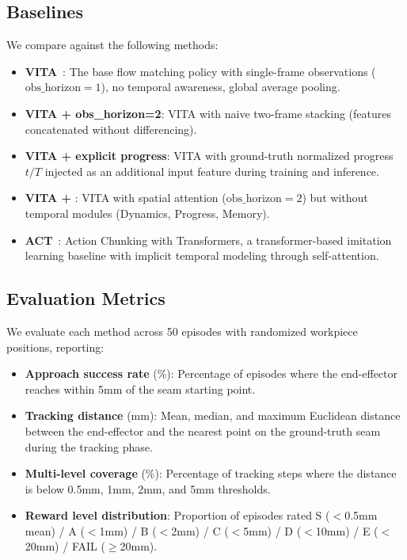 \subsection{Baselines}
\label{sec:baselines}

We compare \method{} against the following methods:

\begin{itemize}[leftmargin=*,itemsep=2pt]
    \item \textbf{VITA}~\cite{gao2026vita}: The base flow matching policy with single-frame observations ($\text{obs\_horizon}=1$), no temporal awareness, global average pooling.
    \item \textbf{VITA + obs\_horizon=2}: VITA with naive two-frame stacking (features concatenated without differencing).
    \item \textbf{VITA + explicit progress}: VITA with ground-truth normalized progress $t/T$ injected as an additional input feature during training and inference.
    \item \textbf{VITA + \fasa{}}: VITA with \fasa{} spatial attention ($\text{obs\_horizon}=2$) but without temporal modules (Dynamics, Progress, Memory).
    \item \textbf{ACT}~\cite{zhao2023act}: Action Chunking with Transformers, a transformer-based imitation learning baseline with implicit temporal modeling through self-attention.
\end{itemize}

\subsection{Evaluation Metrics}
\label{sec:metrics}

We evaluate each method across 50 episodes with randomized workpiece positions, reporting:

\begin{itemize}[leftmargin=*,itemsep=1pt]
    \item \textbf{Approach success rate} (\%): Percentage of episodes where the end-effector reaches within 5mm of the seam starting point.
    \item \textbf{Tracking distance} (mm): Mean, median, and maximum Euclidean distance between the end-effector and the nearest point on the ground-truth seam during the tracking phase.
    \item \textbf{Multi-level coverage} (\%): Percentage of tracking steps where the distance is below 0.5mm, 1mm, 2mm, and 5mm thresholds.
    \item \textbf{Reward level distribution}: Proportion of episodes rated S ($<$0.5mm mean) / A ($<$1mm) / B ($<$2mm) / C ($<$5mm) / D ($<$10mm) / E ($<$20mm) / FAIL ($\geq$20mm).
\end{itemize}

